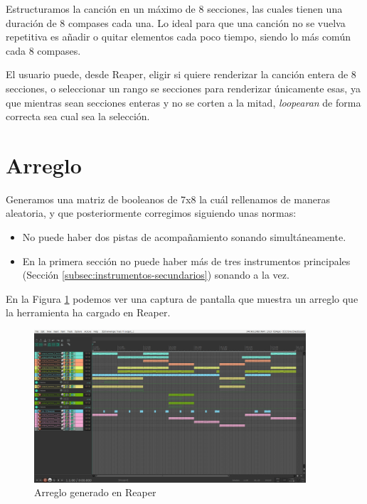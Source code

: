 Estructuramos la canción en un máximo de 8 secciones, las cuales tienen una duración de 8 compases cada una. Lo ideal para que una canción no se vuelva repetitiva es añadir o quitar elementos cada poco tiempo, siendo lo más común cada 8 compases.

El usuario puede, desde Reaper, eligir si quiere renderizar la canción entera de 8 secciones, o seleccionar un rango se secciones para renderizar únicamente esas, ya que mientras sean secciones enteras y no se corten a la mitad, \textit{loopearan} de forma correcta sea cual sea la selección.


\section{Arreglo}
\label{sec:arreglo}

Generamos una matriz de booleanos de 7x8 la cuál rellenamos de maneras aleatoria, y que posteriormente corregimos siguiendo unas normas:

\begin{itemize}

\item No puede haber dos pistas de acompañamiento sonando simultáneamente.
\item En la primera sección no puede haber más de tres instrumentos principales (Sección \ref{subsec:instrumentos-secundarios}) sonando a la vez.
\end{itemize}

En la Figura \ref{fig:ArregloReaper} podemos ver una captura de pantalla que muestra un arreglo que la herramienta ha cargado en Reaper. 

\begin{figure}[h]
    \centering
    \includegraphics[width = 0.9\textwidth]{Imagenes/Bitmap/ArregloReaper.png}
    \caption{Arreglo generado en Reaper}
    \label{fig:ArregloReaper}
\end{figure}

